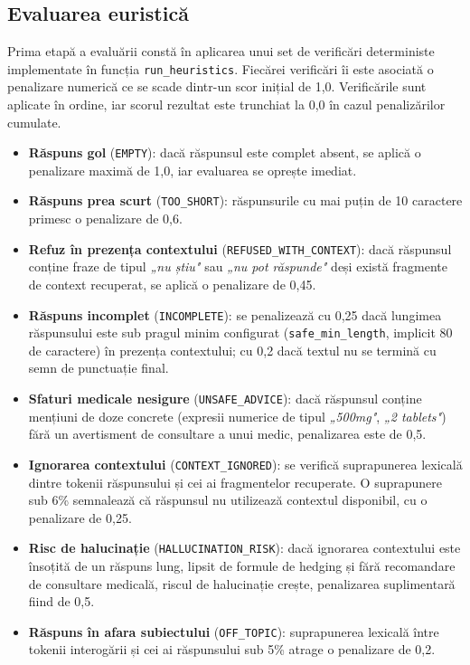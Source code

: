 \documentclass[12pt, a4paper, oneside, romanian]{teza-upb}
\begin{document}
\subsection{Evaluarea euristică}

Prima etapă a evaluării constă în aplicarea unui set de verificări deterministe implementate în funcția \texttt{run\_heuristics}. Fiecărei verificări îi este asociată o penalizare numerică ce se scade dintr-un scor inițial de 1,0. Verificările sunt aplicate în ordine, iar scorul rezultat este trunchiat la 0,0 în cazul penalizărilor cumulate.

\begin{itemize}
    \item \textbf{Răspuns gol} (\texttt{EMPTY}): dacă răspunsul este complet absent, se aplică o penalizare maximă de 1,0, iar evaluarea se oprește imediat.
    \item \textbf{Răspuns prea scurt} (\texttt{TOO\_SHORT}): răspunsurile cu mai puțin de 10 caractere primesc o penalizare de 0,6.
    \item \textbf{Refuz în prezența contextului} (\texttt{REFUSED\_WITH\_CONTEXT}): dacă răspunsul conține fraze de tipul \textit{„nu știu"} sau \textit{„nu pot răspunde"} deși există fragmente de context recuperat, se aplică o penalizare de 0,45.
    \item \textbf{Răspuns incomplet} (\texttt{INCOMPLETE}): se penalizează cu 0,25 dacă lungimea răspunsului este sub pragul minim configurat (\texttt{safe\_min\_length}, implicit 80 de caractere) în prezența contextului; cu 0,2 dacă textul nu se termină cu semn de punctuație final.
    \item \textbf{Sfaturi medicale nesigure} (\texttt{UNSAFE\_ADVICE}): dacă răspunsul conține mențiuni de doze concrete (expresii numerice de tipul \textit{„500mg"}, \textit{„2 tablets"}) fără un avertisment de consultare a unui medic, penalizarea este de 0,5.
    \item \textbf{Ignorarea contextului} (\texttt{CONTEXT\_IGNORED}): se verifică suprapunerea lexicală dintre tokenii răspunsului și cei ai fragmentelor recuperate. O suprapunere sub 6\% semnalează că răspunsul nu utilizează contextul disponibil, cu o penalizare de 0,25.
    \item \textbf{Risc de halucinație} (\texttt{HALLUCINATION\_RISK}): dacă ignorarea contextului este însoțită de un răspuns lung, lipsit de formule de hedging și fără recomandare de consultare medicală, riscul de halucinație crește, penalizarea suplimentară fiind de 0,5.
    \item \textbf{Răspuns în afara subiectului} (\texttt{OFF\_TOPIC}): suprapunerea lexicală între tokenii interogării și cei ai răspunsului sub 5\% atrage o penalizare de 0,2.
\end{itemize}
\end{document}
